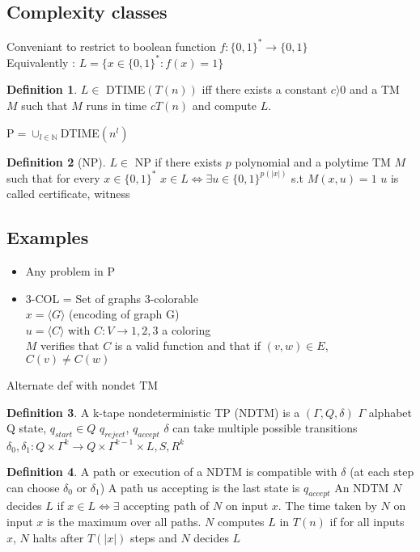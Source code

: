 \documentclass{article}
\theoremstyle{definition}
\newtheorem{definition}{Definition}
\theoremstyle{remark}
\begin{document}
\subsection{Complexity classes}
Conveniant to restrict to boolean function $f:\{0,1\}^*\rightarrow\{0,1\}$\\
Equivalently : $L = \{x \in \{0,1\}^* : f(x)=1\}$

\begin{definition}
	$L \in$ DTIME$(T(n))$ iff there exists a constant $c \rangle 0$ and a TM $M$ such that $M$ runs in time $cT(n)$ and compute $L$.
	
	P$ = \cup_{l \in \mathbb{N}} $DTIME$(n^l)$

\end{definition}

\begin{definition}[NP]
	$L \in$ NP if there exists $p$ polynomial and a polytime TM $M$ such that for every $x\in\{0,1\}^*$
		$x \in L \Leftrightarrow \exists u \in \{0,1\}^{p(|x|)}$ s.t $M(x,u) = 1$
		$u$ is called certificate, witness
\end{definition}

\subsection{Examples}
\begin{itemize}
	\item Any problem in P
	\item 3-COL = Set of graphs 3-colorable\\
	$x = \langle G\rangle$ (encoding of graph G)\\
	$u = \langle C\rangle$ with $C:V\rightarrow{1,2,3}$ a coloring\\
	$M$ verifies that $C$ is a valid function and that if $(v,w) \in E$, $C(v) \neq C(w)$
\end{itemize}
	Alternate def with nondet TM
\begin{definition}
	A k-tape nondeterministic TP (NDTM) is a $(\Gamma,Q,\delta)$
	$\Gamma$ alphabet
	Q state, $q_{start} \in Q$
	$q_{reject}$, $q_{accept}$
	$\delta$ can take multiple possible transitions
		$\delta_0, \delta_1 : Q\times\Gamma^k \rightarrow Q\times\Gamma^{k-1}\times{L,S,R}^k$
\end{definition}

\begin{definition}
	A path or execution of a NDTM is compatible with $\delta$ (at each step can choose $\delta_0$ or $\delta_1$)
	A path us accepting is the last state is $q_{accept}$
	An NDTM $N$ decides $L$ if $x\in L \Leftrightarrow \exists$ accepting path of $N$ on input $x$.
	The time taken by $N$ on input $x$ is the maximum over all paths.
	$N$ computes $L$ in $T(n)$ if for all inputs $x$, $N$ halts after $T(|x|)$ steps and $N$ decides $L$
\end{definition}
\end{document}
